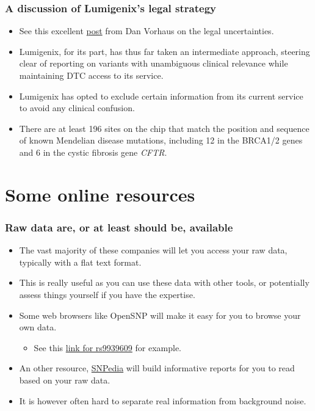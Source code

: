 \documentclass{beamer}
\begin{document}
\begin{frame}
  \frametitle{A discussion of Lumigenix's legal strategy}
  \begin{itemize}
  \item See this excellent \href{http://www.genomicslawreport.com/index.php/2011/06/16/dtc-genetic-testing-and-the-fda-is-there-an-end-in-sight-to-the-regulatory-uncertainty/}{post} from Dan Vorhaus on the legal uncertainties.
  \item Lumigenix, for its part, has thus far taken an intermediate approach, steering clear of reporting on variants with unambiguous clinical relevance while maintaining DTC access to its service.
  \item Lumigenix has opted to exclude certain information from its current service to avoid any clinical confusion.
  \item There are at least 196 sites on the chip that match the position and sequence of known Mendelian disease mutations, including 12 in the BRCA1/2 genes and 6 in the cystic fibrosis gene {\it CFTR}.
  \end{itemize}
\end{frame}

\section{Some online resources}


\begin{frame}
  \frametitle{Raw data are, or at least should be, available}
  \begin{itemize}
  \item The vast majority of these companies will let you access your raw data, typically with a flat text format.
  \item This is really useful as you can use these data with other tools, or potentially assess things yourself if you have the expertise.
  \item Some web browsers like OpenSNP will make it easy for you to browse your own data.
    \begin{itemize}
    \item See this \href{https://opensnp.org/snps/rs9939609}{link for rs9939609} for example.
    \end{itemize}
  \item An other resource, \href{http://www.snpedia.com/index.php/Promethease}{SNPedia} will build informative reports for you to read based on your raw data.
  \item It is however often hard to separate real information from background noise.
  \end{itemize}
\end{frame}
\end{document}
